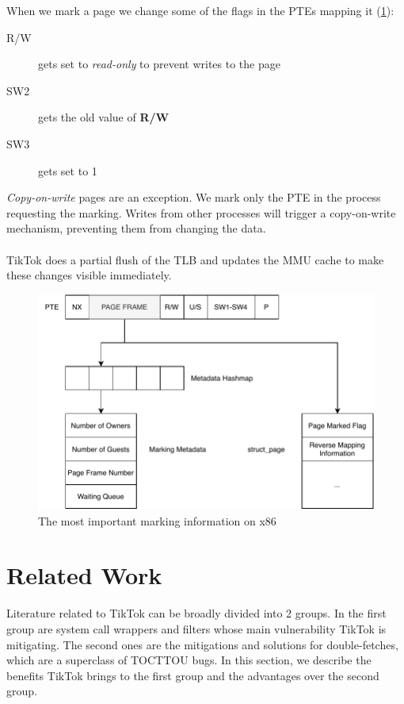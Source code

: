 When we mark a page we change some of the flags in the PTEs mapping it
(\cref{fig:bookkeeping}):

\begin{description}
  \item[R/W] gets set to \emph{read-only} to prevent writes to the page
  \item[SW2] gets the old value of \textbf{R/W}
  \item[SW3] gets set to 1 
\end{description}

\emph{Copy-on-write} pages are an exception. We mark only the PTE in the process
requesting the marking. Writes from other processes will trigger a copy-on-write
mechanism, preventing them from changing the data.
\\
\\
TikTok does a partial flush of the TLB and updates the MMU cache to make these
changes visible immediately.

\begin{figure}[]
  \centering
  \includegraphics[width=\linewidth]{img/book-keeping.pdf}
  \caption{The most important marking information on x86}
  \label{fig:bookkeeping}
\end{figure}


\section{Related Work}
\label{sec:relatedwork}
Literature related to TikTok can be broadly divided into 2 groups. In the first
group are system call wrappers and filters whose main vulnerability TikTok is
mitigating. The second ones are the mitigations and solutions for
double-fetches, which are a superclass of TOCTTOU bugs. In this section, we
describe the benefits TikTok brings to the first group and the advantages over
the second group.

